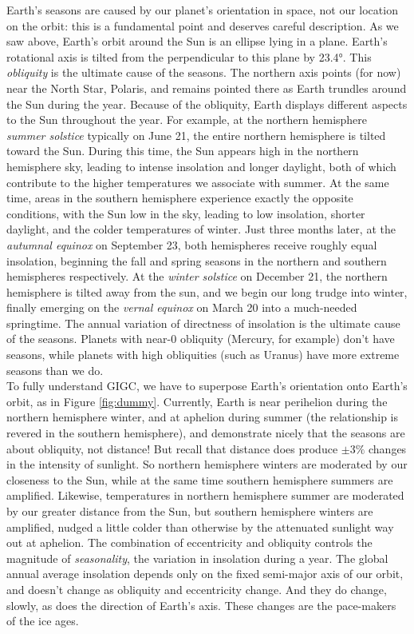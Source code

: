 Earth's seasons are caused by our planet's orientation in space, not our location on the orbit: this is a fundamental point and deserves careful description. As we saw above, Earth's orbit around the Sun is an ellipse lying in a plane. Earth's rotational axis is tilted from the perpendicular to this plane by \ang{23.4}. This \emph{obliquity} is the ultimate cause of the seasons. The northern axis points (for now) near the North Star, Polaris, and remains pointed there as Earth trundles around the Sun during the year. Because of the obliquity, Earth displays different aspects to the Sun throughout the year. For example, at the northern hemisphere \emph{summer solstice} typically on June 21, the entire northern hemisphere is tilted toward the Sun. During this time, the Sun appears high in the northern hemisphere sky, leading to intense insolation and longer daylight, both of which contribute to the higher temperatures we associate with summer. At the same time, areas in the southern hemisphere experience exactly the opposite conditions, with the Sun low in the sky, leading to low insolation, shorter daylight, and the colder temperatures of winter. Just three months later, at the \emph{autumnal equinox} on September 23, both hemispheres receive roughly equal insolation, beginning the fall and spring seasons in the northern and southern hemispheres respectively. At the \emph{winter solstice} on December 21, the northern hemisphere is tilted away from the sun, and we begin our long trudge into winter, finally emerging on the \emph{vernal equinox} on March 20 into a much-needed springtime. The annual variation of directness of insolation is the ultimate cause of the seasons. Planets with near-0 obliquity (Mercury, for example) don't have seasons, while planets with high obliquities (such as Uranus) have more extreme seasons than we do.\\  

To fully understand GIGC, we have to superpose Earth's orientation onto Earth's orbit, as in Figure \ref{fig:dummy}. Currently, Earth is near perihelion during the northern hemisphere winter, and at aphelion during summer (the relationship is revered in the southern hemisphere), and demonstrate nicely that the seasons are about obliquity, not distance! But recall that distance does produce $\pm 3\%$ changes in the intensity of sunlight. So northern hemisphere winters are moderated by our closeness to the Sun, while at the same time southern hemisphere summers are amplified. Likewise, temperatures in northern hemisphere summer are moderated by our greater distance from the Sun, but southern hemisphere winters are amplified, nudged a little colder than otherwise by the attenuated sunlight way out at aphelion. The combination of eccentricity and obliquity controls the magnitude of \emph{seasonality}, the variation in insolation during a year. The global annual average insolation depends only on the fixed semi-major axis of our orbit, and doesn't change as obliquity and eccentricity change. And they do change, slowly, as does the direction of Earth's axis. These changes are the pace-makers of the ice ages.\\


